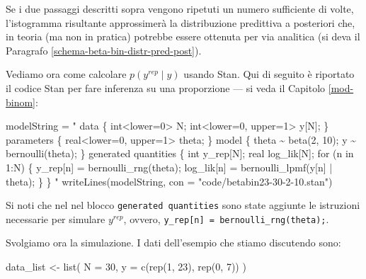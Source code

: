 \documentclass[
  10pt,
  italian,
  a4paper,
  extrafontsizes,onecolumn,openright
  ]{memoir}
\newenvironment{Shaded}{\begin{snugshade}}{\end{snugshade}}
\newcommand{\AttributeTok}[1]{\textcolor[rgb]{0.77,0.63,0.00}{#1}}
\newcommand{\DecValTok}[1]{\textcolor[rgb]{0.00,0.00,0.81}{#1}}
\newcommand{\FunctionTok}[1]{\textcolor[rgb]{0.00,0.00,0.00}{#1}}
\newcommand{\NormalTok}[1]{#1}
\newcommand{\OtherTok}[1]{\textcolor[rgb]{0.56,0.35,0.01}{#1}}
\newcommand{\StringTok}[1]{\textcolor[rgb]{0.31,0.60,0.02}{#1}}
\begin{document}
Se i due passaggi descritti sopra vengono ripetuti un numero sufficiente di volte, l'istogramma risultante approssimerà la distribuzione predittiva a posteriori che, in teoria (ma non in pratica) potrebbe essere ottenuta per via analitica (si deva il Paragrafo \ref{schema-beta-bin-distr-pred-post}).

Vediamo ora come calcolare \(p(y^{rep} \mid y)\) usando Stan. Qui di seguito è riportato il codice Stan per fare inferenza su una proporzione --- si veda il Capitolo \ref{mod-binom}:

\begin{Shaded}
\begin{Highlighting}[]
\NormalTok{modelString }\OtherTok{=} \StringTok{"}
\StringTok{data \{}
\StringTok{  int\textless{}lower=0\textgreater{} N;}
\StringTok{  int\textless{}lower=0, upper=1\textgreater{} y[N];}
\StringTok{\}}
\StringTok{parameters \{}
\StringTok{  real\textless{}lower=0, upper=1\textgreater{} theta;}
\StringTok{\}}
\StringTok{model \{}
\StringTok{  theta \textasciitilde{} beta(2, 10);}
\StringTok{  y \textasciitilde{} bernoulli(theta);}
\StringTok{\}}
\StringTok{generated quantities \{}
\StringTok{  int y\_rep[N];}
\StringTok{  real log\_lik[N];}
\StringTok{  for (n in 1:N) \{}
\StringTok{    y\_rep[n] = bernoulli\_rng(theta);}
\StringTok{    log\_lik[n] = bernoulli\_lpmf(y[n] | theta);}
\StringTok{  \}}
\StringTok{\}}
\StringTok{"}
\FunctionTok{writeLines}\NormalTok{(modelString, }\AttributeTok{con =} \StringTok{"code/betabin23{-}30{-}2{-}10.stan"}\NormalTok{)}
\end{Highlighting}
\end{Shaded}

Si noti che nel nel blocco \texttt{generated\ quantities} sono state aggiunte le istruzioni necessarie per simulare \(y^{rep}\), ovvero, \texttt{y\_rep{[}n{]}\ =\ bernoulli\_rng(theta);}.

Svolgiamo ora la simulazione. I dati dell'esempio che stiamo discutendo sono:

\begin{Shaded}
\begin{Highlighting}[]
\NormalTok{data\_list }\OtherTok{\textless{}{-}} \FunctionTok{list}\NormalTok{(}
  \AttributeTok{N =} \DecValTok{30}\NormalTok{,}
  \AttributeTok{y =} \FunctionTok{c}\NormalTok{(}\FunctionTok{rep}\NormalTok{(}\DecValTok{1}\NormalTok{, }\DecValTok{23}\NormalTok{), }\FunctionTok{rep}\NormalTok{(}\DecValTok{0}\NormalTok{, }\DecValTok{7}\NormalTok{))}
\NormalTok{)}
\end{Highlighting}
\end{Shaded}
\end{document}
